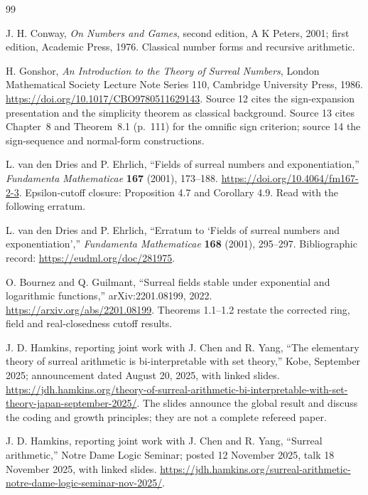 \documentclass[11pt,letterpaper]{article}
\theoremstyle{definition}
\theoremstyle{remark}
\begin{document}
\begin{thebibliography}{99}

J. H. Conway, \emph{On Numbers and Games}, second edition, A K Peters, 2001;
first edition, Academic Press, 1976. Classical number forms and recursive
arithmetic.

H. Gonshor, \emph{An Introduction to the Theory of Surreal Numbers},
London Mathematical Society Lecture Note Series 110, Cambridge University
Press, 1986. \url{https://doi.org/10.1017/CBO9780511629143}. Source 12 cites
the sign-expansion presentation and the simplicity theorem as classical
background. Source 13 cites Chapter~8 and Theorem~8.1 (p.~111) for the omnific
sign criterion; source 14 the sign-sequence and normal-form constructions.

L. van den Dries and P. Ehrlich, ``Fields of surreal numbers and
exponentiation,'' \emph{Fundamenta Mathematicae} \textbf{167} (2001),
173--188. \url{https://doi.org/10.4064/fm167-2-3}. Epsilon-cutoff closure:
Proposition 4.7 and Corollary 4.9. Read with the following erratum.

L. van den Dries and P. Ehrlich, ``Erratum to `Fields of surreal numbers and
exponentiation','' \emph{Fundamenta Mathematicae} \textbf{168} (2001),
295--297. Bibliographic record: \url{https://eudml.org/doc/281975}.

O. Bournez and Q. Guilmant, ``Surreal fields stable under exponential and
logarithmic functions,'' arXiv:2201.08199, 2022.
\url{https://arxiv.org/abs/2201.08199}. Theorems 1.1--1.2 restate the corrected
ring, field and real-closedness cutoff results.

J. D. Hamkins, reporting joint work with J. Chen and R. Yang,
``The elementary theory of surreal arithmetic is bi-interpretable with set
theory,'' Kobe, September 2025; announcement dated August 20, 2025, with linked
slides.
\url{https://jdh.hamkins.org/theory-of-surreal-arithmetic-bi-interpretable-with-set-theory-japan-september-2025/}.
The slides announce the global result and discuss the coding and growth
principles; they are not a complete refereed paper.

J. D. Hamkins, reporting joint work with J. Chen and R. Yang,
``Surreal arithmetic,'' Notre Dame Logic Seminar; posted 12 November 2025, talk
18 November 2025, with linked slides.
\url{https://jdh.hamkins.org/surreal-arithmetic-notre-dame-logic-seminar-nov-2025/}.


\end{thebibliography}
\end{document}
